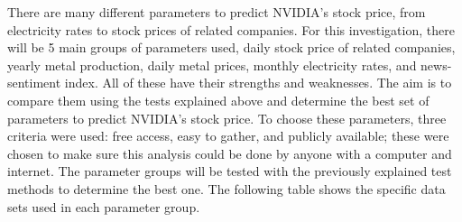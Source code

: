 \documentclass[12pt]{article}
\begin{document}
There are many different parameters to predict NVIDIA’s stock price, from electricity rates to stock prices of related companies. For this investigation, there will be 5 main groups of parameters used, daily stock price of related companies, yearly metal production, daily metal prices, monthly electricity rates, and news-sentiment index. All of these have their strengths and weaknesses. The aim is to compare them using the tests explained above and determine the best set of parameters to predict NVIDIA’s stock price. To choose these parameters, three criteria were used: free access, easy to gather, and publicly available; these were chosen to make sure this analysis could be done by anyone with a computer and internet. The parameter groups will be tested with the previously explained test methods to determine the best one. The following table shows the specific data sets used in each parameter group.
\end{document}
